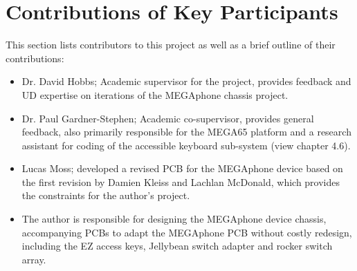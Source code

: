 \section{Contributions of Key Participants} %

This section lists contributors to this project as well as a brief outline of their contributions:

\begin{itemize} 
    \item Dr. David Hobbs; Academic supervisor for the project, provides feedback and UD expertise on iterations of the MEGAphone chassis project.
    \item Dr. Paul Gardner-Stephen; Academic co-supervisor, provides general feedback, also primarily responsible for the MEGA65 platform and a research assistant for coding of the accessible keyboard sub-system (view chapter 4.6).
    \item Lucas Moss; developed a revised PCB for the MEGAphone device based on the first revision by Damien Kleiss and Lachlan McDonald, which provides the constraints for the author's project.
    \item The author is responsible for designing the MEGAphone device chassis, accompanying PCBs to adapt the MEGAphone PCB without costly redesign, including the EZ access keys, Jellybean switch adapter and rocker switch array.
\end{itemize}

